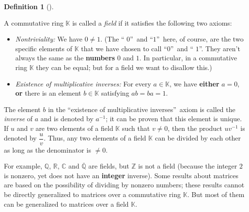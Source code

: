 \documentclass[numbers=enddot,12pt,final,onecolumn,notitlepage]{scrartcl}%
\theoremstyle{definition}
\newtheorem{defi}[theo]{Definition}
\newenvironment{definition}[1][]
{\begin{defi}[#1]\begin{leftbar}}
{\end{leftbar}\end{defi}}
\begin{document}
\begin{definition}
\label{def.field}A commutative ring $\mathbb{K}$ is called a \textit{field} if
it satisfies the following two axioms:

\begin{itemize}
\item \textit{Nontriviality:} We have $0\neq1$. (The \textquotedblleft%
$0$\textquotedblright\ and \textquotedblleft$1$\textquotedblright\ here, of
course, are the two specific elements of $\mathbb{K}$ that we have chosen to
call \textquotedblleft$0$\textquotedblright\ and \textquotedblleft%
$1$\textquotedblright. They aren't always the same as the \textbf{numbers} $0$
and $1$. In particular, in a commutative ring $\mathbb{K}$ they can be equal;
but for a field we want to disallow this.)

\item \textit{Existence of multiplicative inverses:} For every $a\in
\mathbb{K}$, we have \textbf{either} $a=0$, \textbf{or} there is an element
$b\in\mathbb{K}$ satisfying $ab=ba=1$.
\end{itemize}

The element $b$ in the \textquotedblleft existence of multiplicative
inverses\textquotedblright\ axiom is called the \textit{inverse} of $a$ and is
denoted by $a^{-1}$; it can be proven that this element is unique. If $u$ and
$v$ are two elements of a field $\mathbb{K}$ such that $v\neq0$, then the
product $uv^{-1}$ is denoted by $\dfrac{u}{v}$. Thus, any two elements of a
field $\mathbb{K}$ can be divided by each other as long as the denominator is
$\neq0$.
\end{definition}

For example, $\mathbb{Q}$, $\mathbb{R}$, $\mathbb{C}$ and $\overline
{\mathbb{Q}}$ are fields, but $\mathbb{Z}$ is not a field (because the integer
$2$ is nonzero, yet does not have an \textbf{integer} inverse). Some results
about matrices are based on the possibility of dividing by nonzero numbers;
these results cannot be directly generalized to matrices over a commutative
ring $\mathbb{K}$. But most of them can be generalized to matrices over a
field $\mathbb{K}$.
\end{document}
